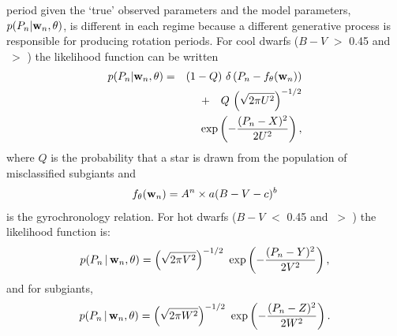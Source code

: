 period given the `true' observed parameters and the model parameters,
$p(P_n|\mathbf{w}_n, \theta)$, is different in each regime because a different
generative process is responsible for producing rotation periods.
For cool dwarfs ($B-V$ $>$ 0.45 and \logg$~>$ \subcut) the likelihood function
can be written
\begin{eqnarray} \label{eq:codw}
p(P_n|\mathbf{w}_n,\theta) &=&
    (1-Q)~\delta \left (P_n - f_\theta(\mathbf{w}_n)\right) \\ \nonumber
    && +\quad Q\,\left(\sqrt{2\pi U^2}\right)^{-1/2} \\ \nonumber
    &&	~\exp\left({-\frac{(P_n-X)^2}{2U^2}}\right),
\end{eqnarray}
where $Q$ is the probability that a star is drawn from the population of
misclassified subgiants and
\begin{eqnarray}
f_\theta(\mathbf{w}_n) = A^n \times a(B-V - c)^b
\label{eq:blank}
\end{eqnarray}
is the gyrochronology relation.
For hot dwarfs ($B-V$ $<$ 0.45 and \logg$~>$ \subcut) the likelihood function
is:
\begin{eqnarray}
p(P_n\,|\,\mathbf{w}_n,\theta) = \left(\sqrt{2\pi V^2}\right)^{-1/2}~
\exp\left({-\frac{(P_n-Y)^2}{2V^2}}\right),
\label{eq:hot_dwarfs}
\end{eqnarray}
and for subgiants,
\begin{eqnarray}
p(P_n\,|\,\mathbf{w}_n,\theta) = \left(\sqrt{2\pi W^2}\right)^{-1/2}~
\exp\left({-\frac{(P_n-Z)^2}{2W^2}}\right).
\label{eq:subgiants}
\end{eqnarray}

